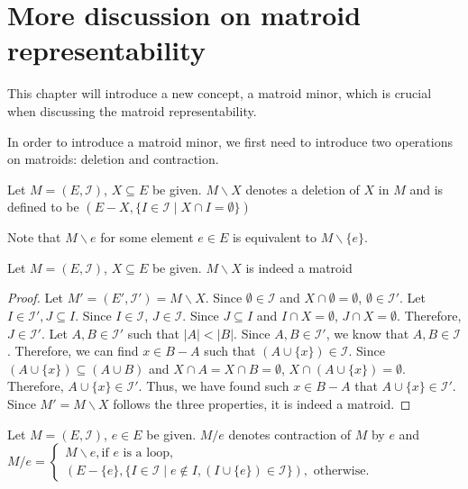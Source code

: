 \section{More discussion on matroid representability}
This chapter will introduce a new concept, a matroid minor, which is crucial when discussing the matroid representability.

In order to introduce a matroid minor, we first need to introduce two operations on matroids: deletion and contraction.

\begin{defn}
Let $M = (E, \mathcal{I})$, $X \subseteq E$ be given.
$M \backslash X$ denotes a deletion of $X$ in $M$ and is defined to be $(E - X, \{ I \in \mathcal{I} \mid X \cap I = \emptyset \})$
\end{defn}

Note that $M \backslash e$ for some element $e \in E$ is equivalent to $M \backslash \{ e \}$.

\begin{thm}
Let $M = (E, \mathcal{I})$, $X \subseteq E$ be given.
$M \backslash X$ is indeed a matroid
\end{thm}

\begin{proof}
Let $M' = (E', \mathcal{I}') = M \backslash X$.
Since $\emptyset \in \mathcal{I}$ and $X \cap \emptyset = \emptyset$, $\emptyset \in \mathcal{I}'$.
Let $I \in \mathcal{I}', J \subseteq I$.
Since $I \in \mathcal{I}$, $J \in \mathcal{I}$.
Since $J \subseteq I$ and $I \cap X = \emptyset$, $J \cap X = \emptyset$.
Therefore, $J \in \mathcal{I}'$.
Let $A, B \in \mathcal{I}'$ such that $\lvert A \rvert < \lvert B \rvert$.
Since $A, B \in \mathcal{I}'$, we know that $A, B \in \mathcal{I}$.
Therefore, we can find $x \in B - A$ such that $(A \cup \{ x \}) \in \mathcal{I}$.
Since $(A \cup \{ x \}) \subseteq (A \cup B)$ and $X \cap A = X \cap B = \emptyset$, $X \cap (A \cup \{ x \}) = \emptyset$.
Therefore, $A \cup \{ x \} \in \mathcal{I}'$.
Thus, we have found such $x \in B - A$ that $A \cup \{ x \} \in \mathcal{I}'$.
Since $M' = M \backslash X$ follows the three properties, it is indeed a matroid. 
\end{proof}

\begin{defn}
Let $M = (E, \mathcal{I})$, $e \in E$ be given.
$M / e$ denotes contraction of $M$ by $e$ and 
$M / e = \begin{cases}
      M \backslash e, \text{if $e$ is a loop},\\
      (E - \{ e \}, \{ I \in \mathcal{I} \mid e \notin I, (I \cup \{ e \}) \in \mathcal{I}\}), \text{ otherwise}.
         \end{cases}$
\end{defn}


